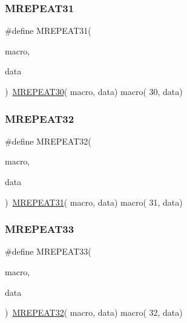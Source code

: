 \mbox{\label{group__group__sam0__utils__mrepeat_ga8716e59c066fbf28d4a05a2df9ce1e7e}} 
\subsubsection{\texorpdfstring{MREPEAT31}{MREPEAT31}}
{\footnotesize\ttfamily \#define M\+R\+E\+P\+E\+A\+T31(\begin{DoxyParamCaption}\item[{}]{macro,  }\item[{}]{data }\end{DoxyParamCaption})~\mbox{\hyperlink{group__group__sam0__utils__mrepeat_ga7b2a77fc380778a167d44b347ac338a8}{M\+R\+E\+P\+E\+A\+T30}}( macro, data)   macro( 30, data)}

\mbox{\label{group__group__sam0__utils__mrepeat_ga36c6234214aab94448eb8c65ecdc2f08}} 
\subsubsection{\texorpdfstring{MREPEAT32}{MREPEAT32}}
{\footnotesize\ttfamily \#define M\+R\+E\+P\+E\+A\+T32(\begin{DoxyParamCaption}\item[{}]{macro,  }\item[{}]{data }\end{DoxyParamCaption})~\mbox{\hyperlink{group__group__sam0__utils__mrepeat_ga8716e59c066fbf28d4a05a2df9ce1e7e}{M\+R\+E\+P\+E\+A\+T31}}( macro, data)   macro( 31, data)}

\mbox{\label{group__group__sam0__utils__mrepeat_ga36d12737d2ee8e77fbdef2f18c697164}} 
\subsubsection{\texorpdfstring{MREPEAT33}{MREPEAT33}}
{\footnotesize\ttfamily \#define M\+R\+E\+P\+E\+A\+T33(\begin{DoxyParamCaption}\item[{}]{macro,  }\item[{}]{data }\end{DoxyParamCaption})~\mbox{\hyperlink{group__group__sam0__utils__mrepeat_ga36c6234214aab94448eb8c65ecdc2f08}{M\+R\+E\+P\+E\+A\+T32}}( macro, data)   macro( 32, data)}

